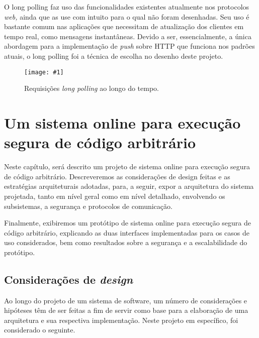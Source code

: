 \documentclass[ruledheader, 12pt]{abnt}
\newcommand{\figcustom}[4]{\par
	\begin{figure}[#3]
		\centering
		\texttt{[image: \#1]}
		\caption{\label{fig:#1}#2}
	\end{figure}
\par}
\begin{document}
O long polling faz uso das funcionalidades existentes atualmente nos protocolos \emph{web,} ainda que as use com intuito para o qual não foram desenhadas. Seu uso é bastante comum nas aplicações que necessitam de atualização dos clientes em tempo real, como mensagens instantâneas. Devido a ser, essencialmente, a única abordagem para a implementação de \emph{push} sobre HTTP que funciona nos padrões atuais, o long polling foi a técnica de escolha no desenho deste projeto.

\figcustom{webmodel-longpolling}{Requisições \emph{long polling} ao longo do tempo.}{bp}{.8}









\chapter{Um sistema online para execução segura de código arbitrário}

Neste capítulo, será descrito um projeto de sistema online para execução segura de código arbitrário. Descreveremos as considerações de design feitas e as estratégias arquiteturais adotadas, para, a seguir, expor a arquitetura do sistema projetada, tanto em nível geral como em nível detalhado, envolvendo os subsistemas, a segurança e protocolos de comunicação.

Finalmente, exibiremos um protótipo de sistema online para execução segura de código arbitrário, explicando as duas interfaces implementadas para os casos de uso considerados, bem como resultados sobre a segurança e a escalabilidade do protótipo.

\section{Considerações de \emph{design}}

Ao longo do projeto de um sistema de software, um número de considerações e hipóteses têm de ser feitas a fim de servir como base para a elaboração de uma arquitetura e sua respectiva implementação. Neste projeto em específico, foi considerado o seguinte.
\end{document}
